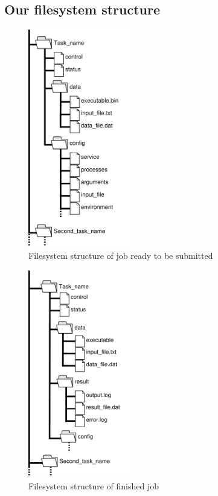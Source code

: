 \documentclass[a4paper,10pt,twocolumn]{article}
\begin{document}
\subsection{Our filesystem structure}

\begin{figure}
 \centering
 \includegraphics[keepaspectratio=true,width=0.4\textwidth,height=0.4\textheight]{./images/filesystem_structure.pdf}
 \caption{Filesystem structure of job ready to be submitted}
 \label{structure}
\end{figure}

\begin{figure}
 \centering
 \includegraphics[keepaspectratio=true,width=0.4\textwidth,height=0.4\textheight]{./images/filesystem_structure_after.pdf}
 \caption{Filesystem structure of finished job}
 \label{structure_after}
\end{figure}
\end{document}
